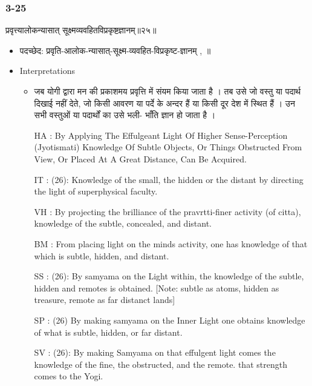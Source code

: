 \begin{frame}[fragile]\frametitle{3-25}
\begin{sanskrit}
प्रवृत्त्यालोकन्यासात् सूक्ष्मव्यवहितविप्रकृष्टज्ञानम्॥२५॥
\end{sanskrit}

	\begin{itemize}
	\item पदच्छेद:   प्रवृति-आलोक-न्यासात्-सूक्ष्म-व्यवहित-विप्रकृष्ट-ज्ञानम् , ॥
	\item Interpretations
		\begin{itemize}	
		\item जब योगी द्वारा मन की प्रकाशमय प्रवृत्ति में संयम किया जाता है । तब उसे जो वस्तु या पदार्थ दिखाई नहीं देते, जो किसी आवरण या पर्दे के अन्दर हैं या किसी दूर देश में स्थित हैं । उन सभी वस्तुओं या पदार्थों का उसे भली- भाँति ज्ञान हो जाता है ।
		\item [HA]: By Applying The Effulgeant Light Of Higher Sense-Perception (Jyotismati) Knowledge Of Subtle Objects, Or Things Obstructed From View, Or Placed At A Great Distance, Can Be Acquired.
		\item [IT]: (26): Knowledge of the small, the hidden or the distant by directing the light of superphysical faculty.
		\item [VH]: By projecting the brilliance of the pravrtti-finer activity (of citta), knowledge of the subtle, concealed, and distant.
		\item [BM]: From placing light on the minds activity, one has knowledge of that which is subtle, hidden, and distant.
		\item [SS]: (26): By samyama on the Light within, the knowledge of the subtle, hidden and remotes is obtained. [Note: subtle as atoms, hidden as treasure, remote as far distanct lands]
		\item [SP]: (26) By making samyama on the Inner Light one obtains knowledge of what is subtle, hidden, or far distant.
		\item [SV]: (26): By making Samyama on that effulgent light comes the knowledge of the fine, the obstructed, and the remote. that strength comes to the Yogi. 
		\end{itemize}
	\end{itemize}
\end{frame}

